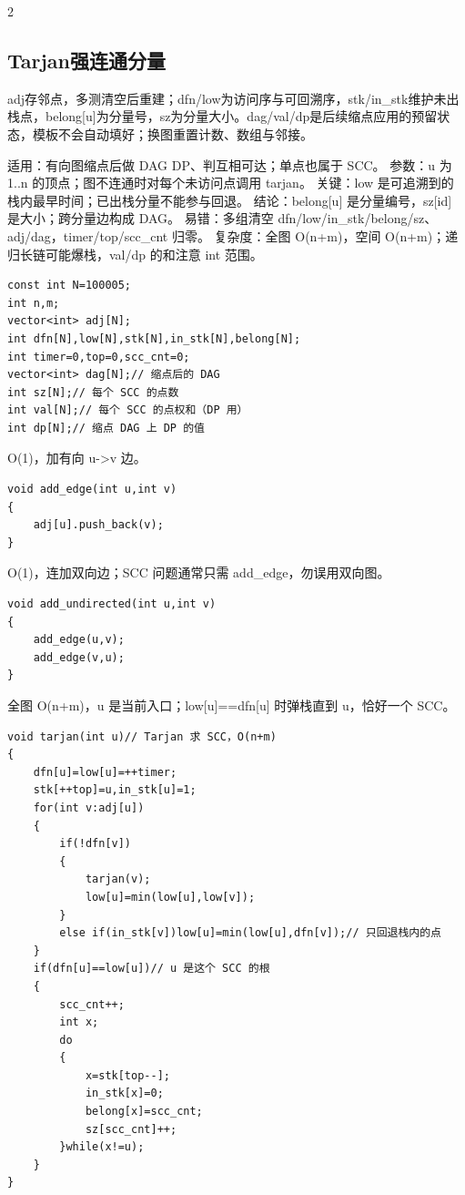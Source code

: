 \documentclass[UTF8,fontset=fandol,a4paper,twoside]{ctexart}
\newcommand{\note}[1]{{\fontsize{10}{12}\selectfont #1\par}}
\begin{document}
\begin{multicols}{2}
\subsection{Tarjan强连通分量}

\note{adj存邻点，多测清空后重建；dfn/\allowbreak{}low为访问序与可回溯序，stk/\allowbreak{}in\_stk维护未出栈点，belong[\allowbreak{}u]\allowbreak{}为分量号，sz为分量大小。dag/\allowbreak{}val/\allowbreak{}dp是后续缩点应用的预留状态，模板不会自动填好；换图重置计数、数组与邻接。}
\note{适用：有向图缩点后做 DAG DP、判互相可达；单点也属于 SCC。 参数：u 为 1.\allowbreak{}.\allowbreak{}n 的顶点；图不连通时对每个未访问点调用 tarjan。 关键：low 是可追溯到的栈内最早时间；已出栈分量不能参与回退。 结论：belong[\allowbreak{}u]\allowbreak{} 是分量编号，sz[\allowbreak{}id]\allowbreak{} 是大小；跨分量边构成 DAG。 易错：多组清空 dfn/\allowbreak{}low/\allowbreak{}in\_stk/\allowbreak{}belong/\allowbreak{}sz、adj/\allowbreak{}dag，timer/\allowbreak{}top/\allowbreak{}scc\_cnt 归零。 复杂度：全图 O(\allowbreak{}n+\allowbreak{}m)\allowbreak{}，空间 O(\allowbreak{}n+\allowbreak{}m)\allowbreak{}；递归长链可能爆栈，val/\allowbreak{}dp 的和注意 int 范围。}
\begin{lstlisting}
const int N=100005;
int n,m;
vector<int> adj[N];
int dfn[N],low[N],stk[N],in_stk[N],belong[N];
int timer=0,top=0,scc_cnt=0;
vector<int> dag[N];// 缩点后的 DAG
int sz[N];// 每个 SCC 的点数
int val[N];// 每个 SCC 的点权和（DP 用）
int dp[N];// 缩点 DAG 上 DP 的值
\end{lstlisting}
\note{O(\allowbreak{}1)\allowbreak{}，加有向 u-\allowbreak{}>\allowbreak{}v 边。}
\begin{lstlisting}
void add_edge(int u,int v)
{
    adj[u].push_back(v);
}
\end{lstlisting}
\note{O(\allowbreak{}1)\allowbreak{}，连加双向边；SCC 问题通常只需 add\_edge，勿误用双向图。}
\begin{lstlisting}
void add_undirected(int u,int v)
{
    add_edge(u,v);
    add_edge(v,u);
}
\end{lstlisting}
\note{全图 O(\allowbreak{}n+\allowbreak{}m)\allowbreak{}，u 是当前入口；low[\allowbreak{}u]\allowbreak{}=\allowbreak{}=\allowbreak{}dfn[\allowbreak{}u]\allowbreak{} 时弹栈直到 u，恰好一个 SCC。}
\begin{lstlisting}
void tarjan(int u)// Tarjan 求 SCC，O(n+m)
{
    dfn[u]=low[u]=++timer;
    stk[++top]=u,in_stk[u]=1;
    for(int v:adj[u])
    {
        if(!dfn[v])
        {
            tarjan(v);
            low[u]=min(low[u],low[v]);
        }
        else if(in_stk[v])low[u]=min(low[u],dfn[v]);// 只回退栈内的点
    }
    if(dfn[u]==low[u])// u 是这个 SCC 的根
    {
        scc_cnt++;
        int x;
        do
        {
            x=stk[top--];
            in_stk[x]=0;
            belong[x]=scc_cnt;
            sz[scc_cnt]++;
        }while(x!=u);
    }
}
\end{lstlisting}

\end{multicols}
\end{document}
